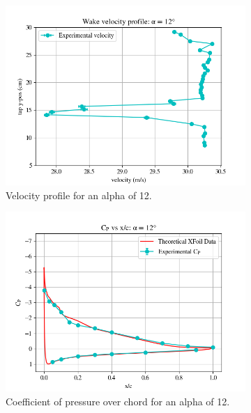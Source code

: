 \documentclass[11pt, letterpaper]{article}
\begin{document}
\begin{figure}[h]
  \begin{subfigure}{0.5\textwidth}
    \centering
    \includegraphics[width=1\linewidth]{Figures/vel-graphs/vel-a12.png}
    \caption{Velocity profile for an alpha of 12\degree.}
    \label{fig:vel-a12}
  \end{subfigure}%
  \begin{subfigure}{0.5\textwidth}
    \centering
    \includegraphics[width=1\textwidth]{Figures/C_p-a12.png}
    \caption{Coefficient of pressure over chord for an alpha of 12\degree.}
    \label{fig:C_p-a12}
  \end{subfigure}
\caption{}
  \label{fig:two2}
\end{figure}
\end{document}
